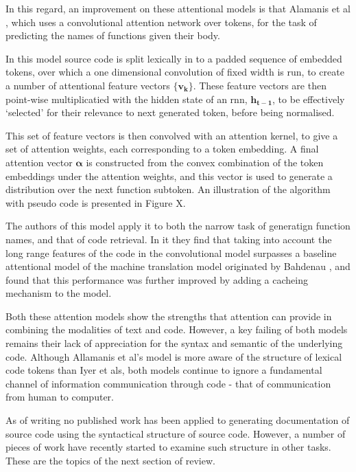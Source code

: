 In this regard, an improvement on these attentional models is that Alamanis et al \cite{allamanis_convolutional_2016}, which uses a convolutional attention network over tokens, for the task of predicting the names of functions given their body. 

In this model source code is split lexically in to a padded sequence of embedded tokens, over which a one dimensional convolution of fixed width is run, to create a number of attentional feature vectors $\mathbf{\{v_k\}}$.
These feature vectors are then point-wise multiplicatied with the hidden state of an rnn, $\mathbf{h_{t-1}}$, to be effectively `selected' for their relevance to next generated token, before being normalised.

This set of feature vectors is then convolved with an attention kernel, to give a set of attention weights, each corresponding to a token embedding. 
A final attention vector $\mathbf{\alpha}$ is constructed from the convex combination of the token embeddings under the attention weights, and this vector is used to generate a distribution over the next function subtoken.
An illustration of the algorithm with pseudo code is presented in Figure X.

The authors of this model apply it to both the narrow task of generatign function names, and that of code retrieval. In it they find that taking into account the long range features of the code in the convolutional model surpasses a baseline attentional model of the machine translation model originated by Bahdenau \cite{bahdanau_neural_2014}, and found that this performance was further improved by adding a cacheing mechanism to the model.

Both these attention models show the strengths that attention can provide in combining the modalities of text and code. However, a key failing of both models remains their lack of appreciation for the syntax and semantic of the underlying code.
Although Allamanis et al's model is more aware of the structure of lexical code tokens than Iyer et als, both models continue to ignore a fundamental channel of information communication through code - that of communication from human to computer.


As of writing no published work has been applied to generating documentation of source code using the syntactical structure of source code.  However, a number of pieces of work have recently started to examine such structure in other tasks. These are the topics of the next section of review.

